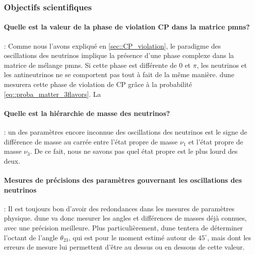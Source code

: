 	        \subsubsection{Objectifs scientifiques}\label{sec::dune_pheno}
	        
	         \paragraph{Quelle est la valeur de la phase de violation CP dans la matrice \gls{pmns}?} : Comme nous l'avons expliqué en \autoref{sec::CP_violation}, le paradigme des oscillations des neutrinos implique la présence d'une phase complexe dans la matrice de mélange \gls{pmns}. Si cette phase est différente de 0 et $\pi$, les neutrinos et les antineutrinos ne se comportent pas tout à fait de la même manière. \gls{dune} mesurera cette phase de violation de CP grâce à la probabilité \eqref{eq::proba_matter_3flavors}. La
	            
	         \paragraph{Quelle est la hiérarchie de masse des neutrinos?} : un des paramètres encore inconnue des oscillations des neutrinos est le signe de différence de masse au carrée entre l'état propre de masse $\nu_1$ et l'état propre de masse $\nu_3$. De ce fait, nous ne savons pas quel état propre est le plus lourd des deux.
	            
	         \paragraph{Mesures de précisions des paramètres gouvernant les oscillations des neutrinos} : Il est toujours bon d'avoir des redondances dans les mesures de paramètres physique. \gls{dune} va donc mesurer les angles et différences de masses déjà connues, avec une précision meilleure. Plus particulièrement, \gls{dune} tentera de déterminer l'octant de l'angle $\theta_{23}$, qui est pour le moment estimé autour de $45^{\circ}$, mais dont les erreurs de mesure lui permettent d'être au dessus ou en dessous de cette valeur\cite{citation_needed}.
	         
